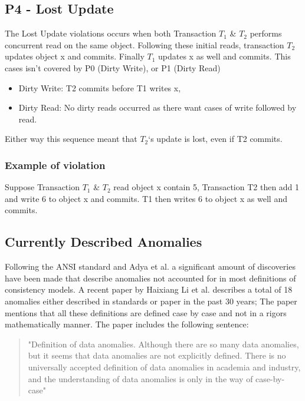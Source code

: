 \documentclass[a4paper,10pt,titlepage]{report}
\begin{document}
\subsection{P4 - Lost Update}

The Lost Update violations occurs when both Transaction $T_1$ \& $T_2$ performs concurrent read on the same object. Following these initial reads, transaction $T_2$ updates object x and commits. Finally $T_1$ updates x as well and commits. 
This cases isn't covered by P0 (Dirty Write), or P1 (Dirty Read)
\begin{itemize}
    \item Dirty Write: T2 commits before T1 writes x,
    \item Dirty Read: No dirty reads occurred as there want cases of write followed by read.
\end{itemize}
Either way this sequence meant that $T_2$‘s update is lost, even if T2 commits.

\subsubsection{Example of violation}

Suppose Transaction $T_1$ \& $T_2$ read object x contain 5, Transaction T2 then add 1 and write 6 to object x and commits. T1 then writes 6 to object x as well and commits. \\
\vspace{2mm}

\vspace{2mm}


\newpage
\subsection{Currently Described Anomalies} 

Following the ANSI standard and Adya et al. \cite{Adya99weakconsistency} a significant amount of discoveries have been made that describe anomalies not accounted for in most definitions of consistency models. A recent paper by Haixiang Li et al. \cite{li2021coo} describes a total of 18 anomalies either described in standards or paper in the past 30 years; The paper mentions that all these definitions are defined case by case and not in a rigors mathematically manner. The paper includes the following sentence: 
\begin{quote}
    "Definition of data anomalies. Although there are so many data anomalies, but it seems that data anomalies are not explicitly defined. There is no universally accepted definition of data anomalies in academia and industry, and the understanding of data anomalies is only in the way of case-by-case" \cite{li2021coo}
\end{quote}
\end{document}
